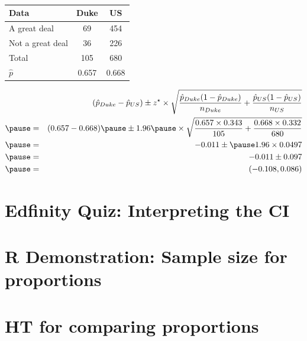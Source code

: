 \documentclass[slidestop,compress,mathserif]{beamer}
\newcommand{\soln}[1]{\textit{#1}}
\begin{document}
\begin{frame}
\frametitle{}


{\footnotesize
\begin{center}
\begin{tabular}{l | c c}
Data			& Duke		& US \\
\hline
A great deal	& 69			& 454 \\
Not a great deal& 36			& 226 \\
\hline
Total			& 105		& 680 \\
\hline
\pause
$\hat{p}$		& 0.657		& 0.668
\end{tabular}
\end{center}
}

\pause

\soln{
\begin{eqnarray*}
&& (\hat{p}_{Duke} - \hat{p}_{US}) \pm z^\star \times \sqrt{ \frac{ \hat{p}_{Duke} (1 - \hat{p}_{Duke})}{n_{Duke} } + \frac{ \hat{p}_{US} (1 -  \hat{p}_{US})}{n_{US} } }  \\
\pause
&=& (0.657 - 0.668) \pause \pm 1.96 \pause \times \sqrt{ \frac{0.657 \times 0.343}{105} + \frac{0.668 \times 0.332}{680} } \\
\pause
&=& -0.011 \pm \pause 1.96 \times 0.0497 \\
\pause
&=& -0.011 \pm 0.097 \\
\pause
&=& (-0.108, 0.086)
\end{eqnarray*}
}


\end{frame}

\section{Edfinity Quiz: Interpreting the CI}

\section{R Demonstration: Sample size for proportions}


\section{HT for comparing proportions}
\end{document}
